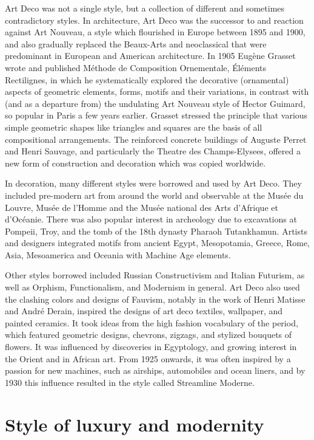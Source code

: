 Art Deco was not a single style, but a collection of different and
sometimes contradictory styles. In architecture, Art Deco was the
successor to and reaction against Art Nouveau, a style which flourished
in Europe between 1895 and 1900, and also gradually replaced the
Beaux-Arts and neoclassical that were predominant in European and
American architecture. In 1905 Eugène Grasset wrote and published
Méthode de Composition Ornementale, Éléments Rectilignes, in which he
systematically explored the decorative (ornamental) aspects of geometric
elements, forms, motifs and their variations, in contrast with (and as a
departure from) the undulating Art Nouveau style of Hector Guimard, so
popular in Paris a few years earlier. Grasset stressed the principle
that various simple geometric shapes like triangles and squares are the
basis of all compositional arrangements. The reinforced concrete
buildings of Auguste Perret and Henri Sauvage, and particularly the
Theatre des Champs-Elysees, offered a new form of construction and
decoration which was copied worldwide.

In decoration, many different styles were borrowed and used by Art Deco.
They included pre-modern art from around the world and observable at the
Musée du Louvre, Musée de l'Homme and the Musée national des Arts
d'Afrique et d'Océanie. There was also popular interest in archeology
due to excavations at Pompeii, Troy, and the tomb of the 18th dynasty
Pharaoh Tutankhamun. Artists and designers integrated motifs from
ancient Egypt, Mesopotamia, Greece, Rome, Asia, Mesoamerica and Oceania
with Machine Age elements.

Other styles borrowed included Russian Constructivism and Italian
Futurism, as well as Orphism, Functionalism, and Modernism in general.
Art Deco also used the clashing colors and designs of Fauvism, notably
in the work of Henri Matisse and André Derain, inspired the designs of
art deco textiles, wallpaper, and painted ceramics. It took ideas from
the high fashion vocabulary of the period, which featured geometric
designs, chevrons, zigzags, and stylized bouquets of flowers. It was
influenced by discoveries in Egyptology, and growing interest in the
Orient and in African art. From 1925 onwards, it was often inspired by a
passion for new machines, such as airships, automobiles and ocean
liners, and by 1930 this influence resulted in the style called
Streamline Moderne.

\section{Style of luxury and
modernity}\label{style-of-luxury-and-modernity}

